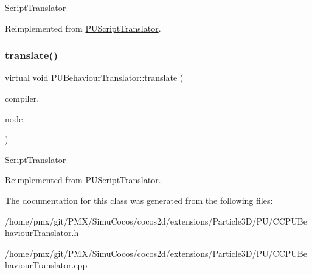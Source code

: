 Script\+Translator 

Reimplemented from \hyperlink{classPUScriptTranslator_a9ff2cdfda9ea8db6fd716e7b69dbe79b}{P\+U\+Script\+Translator}.

\mbox{\label{classPUBehaviourTranslator_a0a5871f37f1301e810ebe57b94e10514}} 
\subsubsection{\texorpdfstring{translate()}{translate()}\hspace{0.1cm}{\footnotesize\ttfamily [2/2]}}
{\footnotesize\ttfamily virtual void P\+U\+Behaviour\+Translator\+::translate (\begin{DoxyParamCaption}\item[{\hyperlink{classPUScriptCompiler}{P\+U\+Script\+Compiler} $\ast$}]{compiler,  }\item[{\hyperlink{classPUAbstractNode}{P\+U\+Abstract\+Node} $\ast$}]{node }\end{DoxyParamCaption})\hspace{0.3cm}{\ttfamily [virtual]}}

Script\+Translator 

Reimplemented from \hyperlink{classPUScriptTranslator_a9ff2cdfda9ea8db6fd716e7b69dbe79b}{P\+U\+Script\+Translator}.



The documentation for this class was generated from the following files\+:\begin{DoxyCompactItemize}
\item 
/home/pmx/git/\+P\+M\+X/\+Simu\+Cocos/cocos2d/extensions/\+Particle3\+D/\+P\+U/C\+C\+P\+U\+Behaviour\+Translator.\+h\item 
/home/pmx/git/\+P\+M\+X/\+Simu\+Cocos/cocos2d/extensions/\+Particle3\+D/\+P\+U/C\+C\+P\+U\+Behaviour\+Translator.\+cpp\end{DoxyCompactItemize}
